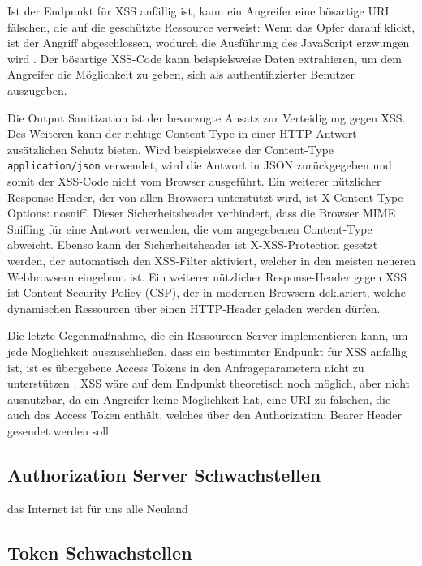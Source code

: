 Ist der Endpunkt für XSS anfällig ist, kann ein Angreifer eine bösartige URI fälschen, die auf die geschützte Ressource verweist: Wenn das Opfer darauf klickt, ist der Angriff abgeschlossen, wodurch die Ausführung des JavaScript erzwungen wird \cite{OAuth2inAction}. Der bösartige XSS-Code kann beispielsweise Daten extrahieren, um dem Angreifer die Möglichkeit zu geben, sich als authentifizierter Benutzer auszugeben. 

Die Output Sanitization ist der bevorzugte Ansatz zur Verteidigung gegen XSS. Des Weiteren kann der richtige Content-Type in einer HTTP-Antwort zusätzlichen Schutz bieten. Wird beispielsweise der Content-Type \texttt{application/json} verwendet, wird die Antwort in JSON zurückgegeben und somit der XSS-Code nicht vom Browser ausgeführt. Ein weiterer nützlicher Response-Header, der von allen Browsern unterstützt wird, ist X-Content-Type-Options: nosniff. Dieser Sicherheitsheader verhindert, dass die Browser MIME Sniffing für eine Antwort verwenden, die vom angegebenen Content-Type abweicht. Ebenso kann der Sicherheitsheader ist X-XSS-Protection gesetzt werden, der automatisch den XSS-Filter aktiviert, welcher in den meisten neueren Webbrowsern eingebaut ist. Ein weiterer nützlicher Response-Header gegen XSS ist Content-Security-Policy (CSP), der in modernen Browsern deklariert, welche dynamischen Ressourcen über einen HTTP-Header geladen werden dürfen.

Die letzte Gegenmaßnahme, die ein Ressourcen-Server implementieren kann, um jede Möglichkeit auszuschließen, dass ein bestimmter Endpunkt für XSS anfällig ist, ist es übergebene Access Tokens in den Anfrageparametern nicht zu unterstützen \cite{OAuth2inAction}. XSS wäre auf dem Endpunkt theoretisch noch möglich, aber nicht ausnutzbar, da ein Angreifer keine Möglichkeit hat, eine URI zu fälschen, die auch das Access Token enthält, welches über den Authorization: Bearer Header gesendet werden soll \cite{OAuth2inAction}.


\subsection{Authorization Server Schwachstellen}

das Internet ist für uns alle Neuland

\subsection{Token Schwachstellen}

